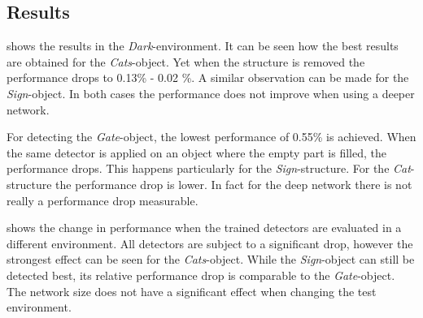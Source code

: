 \subsection{Results}

\begin{table}[hbtp]
	\centering
	
	\caption{Performance of two architectures when the test environment is similar to the training environment (datasets \textit{Test Dark Gate}, \textit{Test Dark Sign}, \textit{Test Dark Cats}). Each trained network (row) is evaluated on each test set (column). It can be seen how the detectors exploit the structure that is placed in the object. In contrary, the detector of \acp{EWFO} only gets confused when the structure inside the object is very different from the training set.}
	\label{tab:all_basement}
\end{table}

 shows the results in the \textit{Dark}-environment. It can be seen how the best results are obtained for the \textit{Cats}-object. Yet when the structure is removed the performance drops to 0.13\% - 0.02 \%. A similar observation can be made for the \textit{Sign}-object. In both cases the performance does not improve when using a deeper network.

For detecting the \textit{Gate}-object, the lowest performance of 0.55\% is achieved. When the same detector is applied on an object where the empty part is filled, the performance drops. This happens particularly for the \textit{Sign}-structure. For the \textit{Cat}-structure the performance drop is lower. In fact for the deep network there is not really a performance drop measurable.

\begin{table}[hbtp]
	\centering
	
	\caption{Change in performance when the detectors are tested in another environment than their training environment (datasets \textit{Test IROS Gate}, \textit{Test IROS Sign}, \textit{Test IROS Cats}). The most severe drop can be seen at the \textit{Cats}-object. The drop for \textit{Gate} is comparable to the \textit{Sign}-object}
	\label{tab:diff_iros}
\end{table}

 shows the change in performance when the trained detectors are evaluated in a different environment. All detectors are subject to a significant drop, however the strongest effect can be seen for the \textit{Cats}-object. While the \textit{Sign}-object can still be detected best, its relative performance drop is comparable to the \textit{Gate}-object. The network size does not have a significant effect when changing the test environment.

